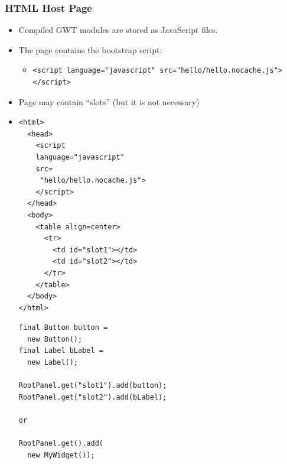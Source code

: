 \documentclass[10pt,table, xcolor=pdflatex]{beamer}
\begin{document}
\begin{frame}[fragile]\frametitle{HTML Host Page}
	\begin{itemize}
		\item Compiled GWT modules are stored as JavaScript files.
        \item The page contains the bootstrap script:
          \begin{itemize}
        	\item 
            	\lstset{language=XML}
				\begin{lstlisting}
<script language="javascript" src="hello/hello.nocache.js"></script>
                \end{lstlisting}
          \end{itemize}
        \item Page may contain ``slots'' (but it is not necessary)
        \item[]
        	\begin{multicols}{2}
              	\lstset{language=XML, basicstyle=\footnotesize\ttfamily}
              	\begin{lstlisting}
<html>
  <head>
    <script 
    language="javascript" 
    src=
     "hello/hello.nocache.js">
    </script>
  </head>
  <body>
    <table align=center>
      <tr>
        <td id="slot1"></td>
        <td id="slot2"></td>
      </tr>
    </table>
  </body>
</html>          
            	\end{lstlisting}
            \columnbreak
              	\lstset{language=Java, basicstyle=\footnotesize\ttfamily}
              	\begin{lstlisting}
final Button button = 
  new Button();
final Label bLabel = 
  new Label();
  
RootPanel.get("slot1").add(button);
RootPanel.get("slot2").add(bLabel);

or

RootPanel.get().add(
  new MyWidget());       
            	\end{lstlisting}
            \end{multicols}
	\end{itemize}
\end{frame}
\end{document}
